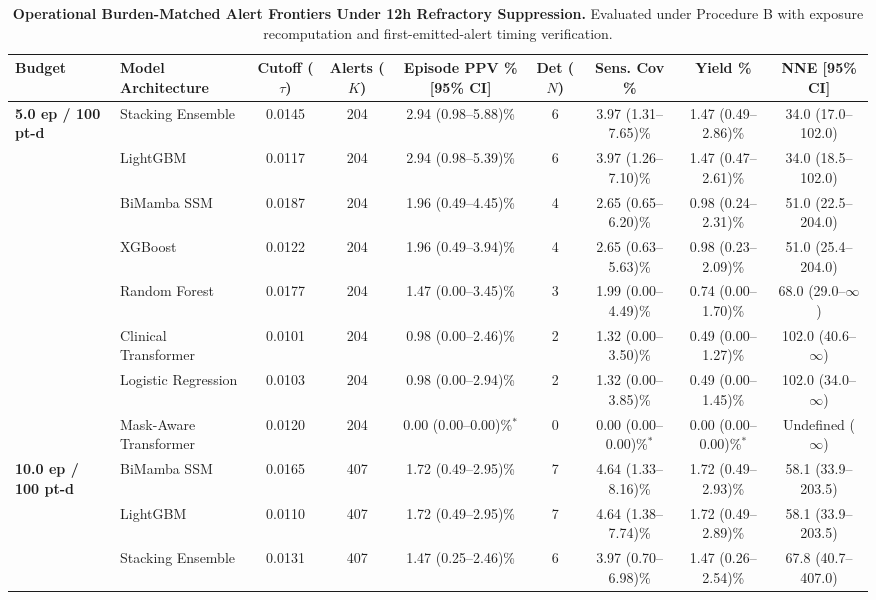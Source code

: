 \documentclass[10pt,twocolumn,a4paper]{article}
\begin{document}
\begin{table}[t]
\centering
\fontsize{5.8pt}{6.9pt}\selectfont
\renewcommand{\arraystretch}{0.92}
\setlength{\tabcolsep}{1.8pt}
\caption{\textbf{Operational Burden-Matched Alert Frontiers Under 12h Refractory Suppression.} Evaluated under Procedure B with exposure recomputation and first-emitted-alert timing verification.}
\label{tab:table3}
\begin{tabular*}{\textwidth}{@{\extracolsep{\fill}}llccccccc@{}}
\toprule
\textbf{Budget} & \textbf{Model Architecture} & \textbf{Cutoff ($\tau$)} & \textbf{Alerts ($K$)} & \textbf{Episode PPV \% [95\% CI]} & \textbf{Det ($N$)} & \textbf{Sens. Cov \%} & \textbf{Yield \%} & \textbf{NNE [95\% CI]} \\
\midrule
\textbf{5.0 ep / 100 pt-d} & Stacking Ensemble & 0.0145 & 204 & 2.94 (0.98--5.88)\% & 6 & 3.97 (1.31--7.65)\% & 1.47 (0.49--2.86)\% & 34.0 (17.0--102.0) \\
 & LightGBM & 0.0117 & 204 & 2.94 (0.98--5.39)\% & 6 & 3.97 (1.26--7.10)\% & 1.47 (0.47--2.61)\% & 34.0 (18.5--102.0) \\
 & BiMamba SSM & 0.0187 & 204 & 1.96 (0.49--4.45)\% & 4 & 2.65 (0.65--6.20)\% & 0.98 (0.24--2.31)\% & 51.0 (22.5--204.0) \\
 & XGBoost & 0.0122 & 204 & 1.96 (0.49--3.94)\% & 4 & 2.65 (0.63--5.63)\% & 0.98 (0.23--2.09)\% & 51.0 (25.4--204.0) \\
 & Random Forest & 0.0177 & 204 & 1.47 (0.00--3.45)\% & 3 & 1.99 (0.00--4.49)\% & 0.74 (0.00--1.70)\% & 68.0 (29.0--$\infty$) \\
 & Clinical Transformer & 0.0101 & 204 & 0.98 (0.00--2.46)\% & 2 & 1.32 (0.00--3.50)\% & 0.49 (0.00--1.27)\% & 102.0 (40.6--$\infty$) \\
 & Logistic Regression & 0.0103 & 204 & 0.98 (0.00--2.94)\% & 2 & 1.32 (0.00--3.85)\% & 0.49 (0.00--1.45)\% & 102.0 (34.0--$\infty$) \\
 & Mask-Aware Transformer & 0.0120 & 204 & 0.00 (0.00--0.00)\%$^*$ & 0 & 0.00 (0.00--0.00)\%$^*$ & 0.00 (0.00--0.00)\%$^*$ & Undefined ($\infty$) \\
\midrule
\textbf{10.0 ep / 100 pt-d} & BiMamba SSM & 0.0165 & 407 & 1.72 (0.49--2.95)\% & 7 & 4.64 (1.33--8.16)\% & 1.72 (0.49--2.93)\% & 58.1 (33.9--203.5) \\
 & LightGBM & 0.0110 & 407 & 1.72 (0.49--2.95)\% & 7 & 4.64 (1.38--7.74)\% & 1.72 (0.49--2.89)\% & 58.1 (33.9--203.5) \\
 & Stacking Ensemble & 0.0131 & 407 & 1.47 (0.25--2.46)\% & 6 & 3.97 (0.70--6.98)\% & 1.47 (0.26--2.54)\% & 67.8 (40.7--407.0) \\

\end{tabular*}
\end{table}
\end{document}
